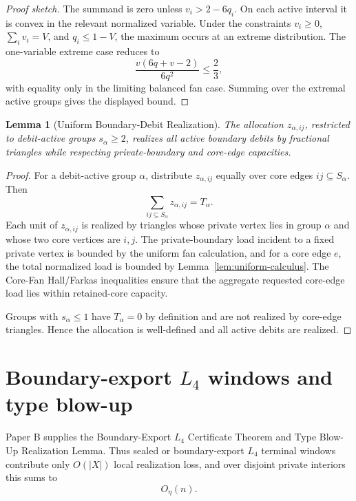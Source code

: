 \documentclass[11pt]{article}
\newtheorem{lemma}[theorem]{Lemma}
\theoremstyle{definition}
\begin{document}
\begin{proof}[Proof sketch]
The summand is zero unless \(v_i>2-6q_i\). On each active interval it is convex in the relevant normalized variable. Under the constraints \(v_i\ge0\), \(\sum_i v_i=V\), and \(q_i\le1-V\), the maximum occurs at an extreme distribution. The one-variable extreme case reduces to
\[
    \frac{v(6q+v-2)}{6q^2}
    \le
    \frac23,
\]
with equality only in the limiting balanced fan case. Summing over the extremal active groups gives the displayed bound.
\end{proof}

\begin{lemma}[Uniform Boundary-Debit Realization]\label{lem:uniform-realization}
The allocation \(z_{\alpha,ij}\), restricted to debit-active groups \(s_\alpha\ge2\), realizes all active boundary debits by fractional triangles while respecting private-boundary and core-edge capacities.
\end{lemma}

\begin{proof}
For a debit-active group \(\alpha\), distribute \(z_{\alpha,ij}\) equally over core edges \(ij\subseteq S_\alpha\). Then
\[
    \sum_{ij\subseteq S_\alpha}z_{\alpha,ij}=T_\alpha.
\]
Each unit of \(z_{\alpha,ij}\) is realized by triangles whose private vertex lies in group \(\alpha\) and whose two core vertices are \(i,j\). The private-boundary load incident to a fixed private vertex is bounded by the uniform fan calculation, and for a core edge \(e\), the total normalized load is bounded by Lemma~\ref{lem:uniform-calculus}. The Core-Fan Hall/Farkas inequalities ensure that the aggregate requested core-edge load lies within retained-core capacity.

Groups with \(s_\alpha\le1\) have \(T_\alpha=0\) by definition and are not realized by core-edge triangles. Hence the allocation is well-defined and all active debits are realized.
\end{proof}


\section{Boundary-export \(L_4\) windows and type blow-up}

Paper B supplies the Boundary-Export \(L_4\) Certificate Theorem and Type Blow-Up Realization Lemma. Thus sealed or boundary-export \(L_4\) terminal windows contribute only \(O(|X|)\) local realization loss, and over disjoint private interiors this sums to
\[
    O_\eta(n).
\]
\end{document}
